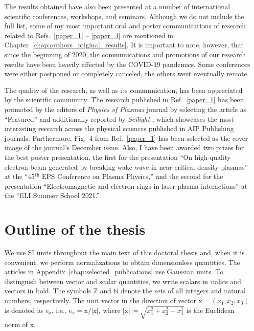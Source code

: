 \documentclass[10pt, a4paper, twoside, openright]{report}
\newcommand{\q}[1]{``#1''} %
\newcommand{\norm}[1]{|#1|}
\renewcommand{\vec}[1]{\boldsymbol{\mathrm{#1}}}
\begin{document}
The results obtained have also been presented at a number of international scientific conferences, workshops, and seminars. Although we do not include the full list, some of my most important oral and poster communications of research related to Refs.~\ref{paper_1} -- \ref{paper_4} are mentioned in Chapter~\ref{chap:authors_original_results}. It is important to note, however, that since the beginning of 2020, the communications and promotions of our research results have been heavily affected by the COVID-19 pandemics. Some conferences were either postponed or completely canceled, the others went eventually remote.

The quality of the research, as well as its communication, has been appreciated by the scientific community: The research published in Ref.~\ref{paper_1} has been promoted by the editors of \textit{Physics of Plasmas} journal by selecting the article as \q{Featured} and additionally reported by \textit{Scilight} \cite{Patrick2021}, which showcases the most interesting research across the physical sciences published in AIP Publishing journals. Furthermore, Fig.~4 from Ref.~\ref{paper_1} has been selected as the cover image of the journal's December issue. Also, I have been awarded two prizes for the best poster presentation, the first for the presentation \q{On high-quality electron beam generated by breaking wake wave in near-critical density plasmas} at the \q{45$ ^{\mathrm{th}} $ EPS Conference on Plasma Physics,} and the second for the presentation \q{Electromagnetic and electron rings in laser-plasma interactions} at the \q{ELI Summer School 2021.} 

\section{Outline of the thesis}
%

We use SI units throughout the main text of this doctoral thesis and, when it is convenient, we perform normalizations to obtain dimensionless quantities. The articles in Appendix~\ref{chap:selected_publications} use Gaussian units. To distinguish between vector and scalar quantities, we write scalars in italics and vectors in bold. The symbols $ \mathbb{Z} $ and $ \mathbb{N} $ denote the sets of all integers and natural numbers, respectively. The unit vector in the direction of vector $ \vec{x} = \left( x_1, x_2, x_3 \right) $ is denoted as $ \vec{e}_{x} $, i.e., $ \vec{e}_{x} = \vec{x} / \norm{\vec{x}} $, where $ \norm{\vec{x}} \coloneq \sqrt{x_1^2 + x_2^2 + x_3^2} $ is the Euclidean norm of $ \vec{x} $. 
\end{document}
